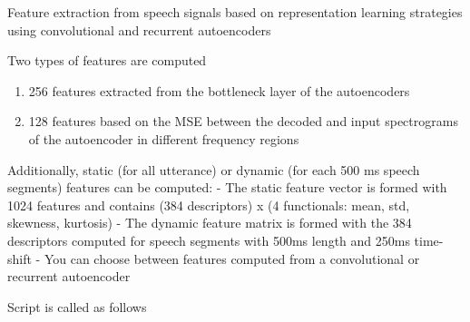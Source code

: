 \documentclass[letterpaper,10pt,english]{sphinxmanual}
\let\sphinxpxdimen\pdfpxdimen\else\newdimen\sphinxpxdimen
\begin{document}
\noindent\sphinxincludegraphics[width=600\sphinxpxdimen]{{replearning_error}.png}
\label{\detokenize{RepLearning:module-replearning}}

\begin{fulllineitems}
\label{\detokenize{RepLearning:replearning.RepLearning}}
Feature extraction from speech signals based on representation learning strategies using convolutional and recurrent autoencoders

Two types of features are computed
\begin{enumerate}
\item {} 
256 features extracted from the bottleneck layer of the autoencoders

\item {} 
128 features based on the MSE between the decoded and input spectrograms of the autoencoder in different frequency regions

\end{enumerate}

Additionally, static (for all utterance) or dynamic (for each 500 ms speech segments) features can be computed:
- The static feature vector is formed with 1024 features and contains (384 descriptors) x (4 functionals: mean, std, skewness, kurtosis)
- The dynamic feature matrix is formed with the 384 descriptors computed for speech segments with 500ms length and 250ms time-shift
- You can choose between features computed from a convolutional or recurrent autoencoder

Script is called as follows

\begin{sphinxVerbatim}[commandchars=\\\{\}]
                    
\end{sphinxVerbatim}


\end{fulllineitems}
\end{document}
